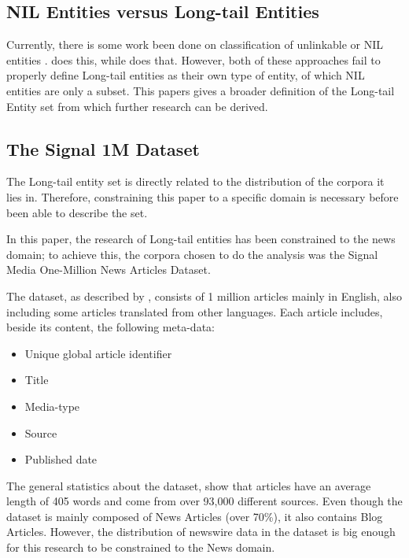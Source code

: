 \subsection{NIL Entities versus Long-tail Entities}\label{nilvslongtail}
Currently, there is some work been done on classification of unlinkable or NIL entities \cite{someone}.
\cite{someone} does this, while \cite{someone} does that.
However, both of these approaches fail to properly define Long-tail entities as their own type of entity, of which NIL entities are only a subset.
This papers gives a broader definition of the Long-tail Entity set from which further research can be derived. 

\subsection{The Signal 1M Dataset}
The Long-tail entity set is directly related to the distribution of the corpora it lies in.
Therefore, constraining this paper to a specific domain is necessary before been able to describe the set.

In this paper, the research of Long-tail entities has been constrained to the news domain;
to achieve this, the corpora chosen to do the analysis was the Signal Media One-Million News Articles Dataset\cite{Signal1M2016}.

The dataset, as described by \cite{Signal1M2016}, consists of 1 million articles mainly in English,
also including some articles translated from other languages.
Each article includes, beside its content, the following meta-data:
\begin{itemize}
  \item Unique global article identifier
  \item Title
  \item Media-type
  \item Source
  \item Published date
\end{itemize}

The general statistics about the dataset, show that articles have an average length of 405 words and come from over 93,000 different sources.
Even though the dataset is mainly composed of News Articles (over 70\%), it also contains Blog Articles\cite{Signal1M2016}.
However, the distribution of newswire data in the dataset is big enough for this research to be constrained to the News domain.
